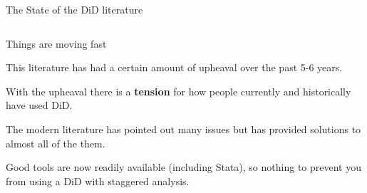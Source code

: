 \documentclass[notes,11pt, aspectratio=169]{beamer}
\newenvironment{wideitemize}{\itemize\addtolength{\itemsep}{10pt}}{\enditemize}
\begin{document}
\begin{frame}{The State of the DiD literature}
  \begin{columns}[T] %
    \begin{column}{.6\textwidth}
      \begin{wideitemize}
      \item Things are moving fast 

      \item This literature has had a certain amount of upheaval over the past 5-6 years. 
        
      \item With the upheaval there is a \textbf{tension} for how people currently and historically have used DiD.

      \item The modern literature has pointed out many issues but has provided solutions to almost all of the them.
      
      \item Good tools are now readily available (including Stata), so nothing to prevent you from using a DiD with staggered analysis.


\end{wideitemize}
\end{column}
\end{columns}
\end{frame}
\end{document}
